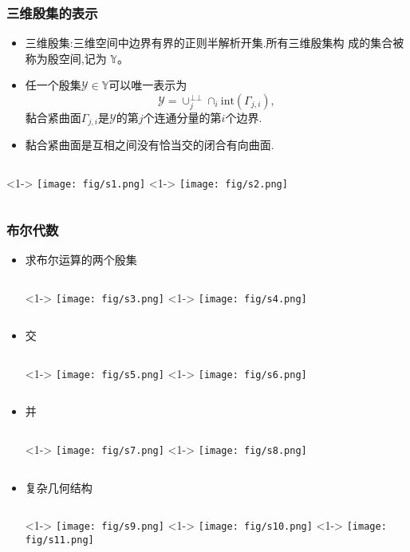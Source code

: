 \documentclass[UTF8]{ctexbeamer}	%
\theoremstyle{plain}
\theoremstyle{definition}
\theoremstyle{remark}
\numberwithin{equation}{section}
\begin{document}
\begin{frame}
    \frametitle{三维殷集的表示}
    \begin{itemize}
        \item 三维殷集:三维空间中边界有界的正则半解析开集.所有三维殷集构
        成的集合被称为殷空间,记为 $\mathbb{Y}$。
        \item 任一个殷集$\mathcal{Y} \in \mathbb{Y}$可以唯一表示为
        \[\mathcal{Y} = \cup_j^{\bot \bot} \cap_i \text{int}(\Gamma_{j, i}),\]
        黏合紧曲面$\Gamma_{j, i}$是$\mathcal{Y}$的第$j$个连通分量的第$i$个边界.
        \item 黏合紧曲面是互相之间没有恰当交的闭合有向曲面.
    \end{itemize}
    \begin{columns}
        <1->
            \texttt{[image: fig/s1.png]}
        <1->
        \texttt{[image: fig/s2.png]}
    \end{columns}
\end{frame}

\begin{frame}
    \frametitle{布尔代数}
    \begin{itemize}
        \item 求布尔运算的两个殷集
        \begin{columns}
            <1->
                \texttt{[image: fig/s3.png]}
            <1->
            \texttt{[image: fig/s4.png]}
        \end{columns}
        \item 交
        \begin{columns}
            <1->
                \texttt{[image: fig/s5.png]}
            <1->
            \texttt{[image: fig/s6.png]}
        \end{columns}
    \end{itemize}
\end{frame}

\begin{frame}
    \begin{itemize}
        \item 并 \begin{columns}
            <1->
                \texttt{[image: fig/s7.png]}
            <1->
            \texttt{[image: fig/s8.png]}
        \end{columns}
        \item 复杂几何结构
        \begin{columns}
            <1->
                \texttt{[image: fig/s9.png]}
            <1->
            \texttt{[image: fig/s10.png]}
            <1->
            \texttt{[image: fig/s11.png]}
        \end{columns}
    \end{itemize}
\end{frame}
\end{document}
